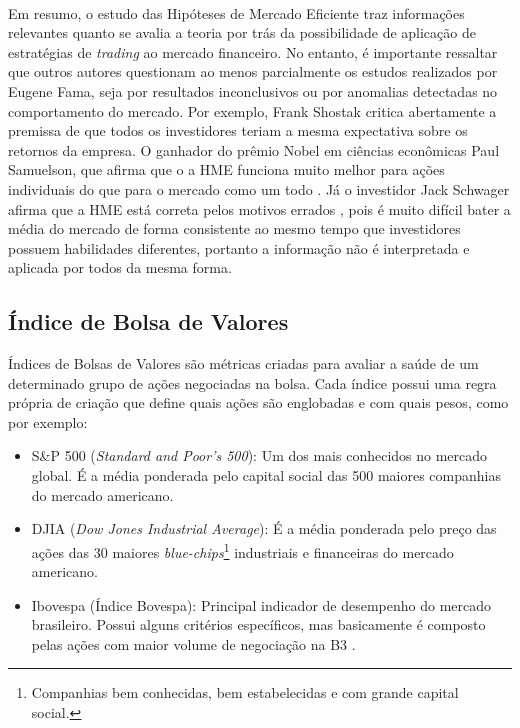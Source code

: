 \paragraph{} Em resumo, o estudo das Hipóteses de Mercado Eficiente traz informações relevantes quanto se avalia a teoria por trás da possibilidade de aplicação de estratégias de \textit{trading} ao mercado financeiro. No entanto, é importante ressaltar que outros autores questionam ao menos parcialmente os estudos realizados por Eugene Fama, seja por resultados inconclusivos ou por anomalias detectadas no comportamento do mercado. Por exemplo, Frank Shostak \cite{shostak1997defense} critica abertamente a premissa de que todos os investidores teriam a mesma expectativa sobre os retornos da empresa. O ganhador do prêmio Nobel em ciências econômicas Paul Samuelson, que afirma que o a HME funciona muito melhor para ações individuais do que para o mercado como um todo \cite{jung2005samuelson}. Já o investidor Jack Schwager afirma que a HME está correta pelos motivos errados \cite{schwager2012market}, pois é muito difícil bater a média do mercado de forma consistente ao mesmo tempo que investidores possuem habilidades diferentes, portanto a informação não é interpretada e aplicada por todos da mesma forma.



\FloatBarrier
\subsection{Índice de Bolsa de Valores}
\label{sub:ibov}

Índices de Bolsas de Valores \cite{stock_index} são métricas criadas para avaliar a saúde de um determinado grupo de ações negociadas na bolsa. Cada índice possui uma regra própria de criação que define quais ações são englobadas e com quais pesos, como por exemplo:

\begin{itemize}
    \item S\&P 500 (\textit{Standard and Poor's 500}): Um dos mais conhecidos no mercado global. É a média ponderada pelo capital social das 500 maiores companhias do mercado americano.
    \item DJIA (\textit{Dow Jones Industrial Average}): É a média ponderada pelo preço das ações das 30 maiores \textit{blue-chips}\footnote{Companhias bem conhecidas, bem estabelecidas e com grande capital social.} industriais e financeiras do mercado americano.
    \item Ibovespa (Índice Bovespa): Principal indicador de desempenho do mercado brasileiro. Possui alguns critérios específicos, mas basicamente é composto pelas ações com maior volume de negociação na B3 \cite{ibovespa}.
\end{itemize}

